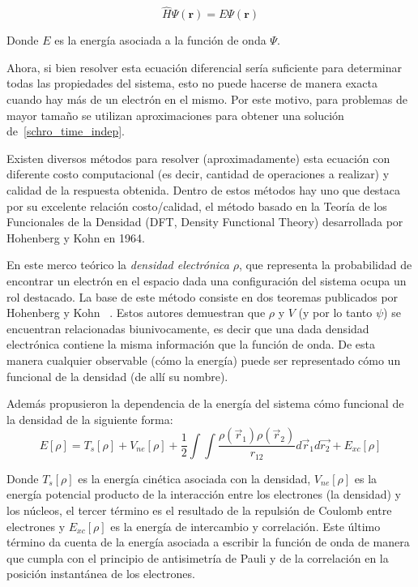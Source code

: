 \begin{equation}
    \label{schro_time_indep}
    \hat{H} \Psi(\mathbf{r}) = E \Psi(\mathbf{r})
\end{equation}

Donde $E$ es la energ\'ia asociada a la funci\'on de onda $\Psi$.

Ahora, si bien resolver esta ecuaci\'on diferencial ser\'ia suficiente para determinar todas las propiedades del sistema, esto no puede hacerse de
manera exacta cuando hay m\'as de un electr\'on en el mismo. Por este motivo, para problemas de mayor tama\~no se utilizan aproximaciones
para obtener una soluci\'on de~\ref{schro_time_indep}.

Existen diversos m\'etodos para resolver (aproximadamente) esta ecuaci\'on con diferente costo computacional (es decir, cantidad de operaciones a realizar)
y calidad de la respuesta obtenida. Dentro de estos m\'etodos hay uno que destaca por su excelente relaci\'on costo/calidad, el m\'etodo basado en la Teor\'ia de los Funcionales de la Densidad
(DFT, Density Functional Theory) desarrollada por Hohenberg y Kohn en 1964.

En este merco te\'orico la \textit{densidad electr\'onica} $\rho$, que representa la probabilidad de encontrar un electr\'on en
el espacio dada una configuraci\'on del sistema ocupa un rol destacado.
La base de este m\'etodo consiste en dos teoremas publicados por Hohenberg y Kohn ~\cite{HohenbergKohn}.
Estos autores demuestran que $\rho$ y $V$ (y por lo tanto $\psi$) se encuentran relacionadas biunivocamente,
es decir que una dada densidad electr\'onica contiene la misma informaci\'on que la funci\'on de onda.
De esta manera cualquier observable (c\'omo la energ\'ia) puede ser representado c\'omo un funcional de la densidad (de all\'i su nombre).

Adem\'as propusieron la dependencia de la energ\'ia del sistema c\'omo funcional de la densidad de la siguiente forma:
\begin{equation}
    \label{hohenberg_kohn_energy}
    E[\rho] = T_s[\rho] + V_{ne}[\rho] + \frac{1}{2} \int \int \frac{\rho(\vec{r}_1) \rho(\vec{r}_2)}{r_{12}} d\vec{r}_1 d\vec{r_2} + E_{xc}[\rho]
\end{equation}

Donde $T_s[\rho]$ es la energ\'ia cin\'etica asociada con la densidad, $V_{ne}[\rho]$ es la energ\'ia potencial producto de la interacci\'on entre los
electrones (la densidad) y los n\'ucleos, el tercer t\'ermino es el resultado de la repulsi\'on de Coulomb entre electrones y $E_{xc}[\rho]$ es la
energ\'ia de intercambio y correlaci\'on. Este \'ultimo t\'ermino da cuenta de la energ\'ia asociada a escribir la funci\'on de onda de manera que cumpla con el principio de antisimetr\'ia de Pauli y de la correlaci\'on
en la posici\'on instant\'anea de los electrones.

